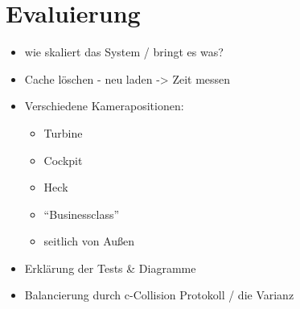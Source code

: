 \chapter{Evaluierung}
\begin{itemize}
 \item wie skaliert das System / bringt es was?
 \item Cache löschen - neu laden -> Zeit messen
 \item Verschiedene Kamerapositionen:
 \begin{itemize}
  \item Turbine
  \item Cockpit
  \item Heck
  \item ``Businessclass''
  \item seitlich von Außen
 \end{itemize}
 \item Erklärung der Tests \& Diagramme
 \item Balancierung durch c-Collision Protokoll / die Varianz
\end{itemize}



